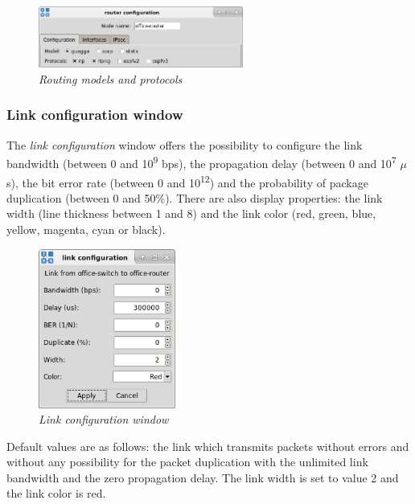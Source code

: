 \begin{figure}[H]
\centering
\vspace{10pt}
\includegraphics[width=0.6\textwidth]{./images/router_config_routingmodels.png}
\caption{\emph{Routing models and protocols}}
\label{fig:router_config_routingmodels}
\end{figure}

\subsubsection{Link configuration window}
The \emph{link configuration} window offers the possibility to configure the
link bandwidth (between 0 and 10\textsuperscript{9} bps), the propagation delay
(between 0 and 10\textsuperscript{7} $\mu$s), the bit error
rate (between 0 and 10\textsuperscript{12}) and the probability of package
duplication (between 0 and 50\%). There are also display properties: the link
width (line thickness between 1 and 8) and the link color (red, green, blue,
yellow, magenta, cyan or black).

\begin{figure}[H]
\centering
\vspace{10pt}
\includegraphics[width=0.4\textwidth]{./images/link_config.png}
\caption{\emph{Link configuration window}}
\label{fig:link_config}
\end{figure}

Default values are as follows: the link which transmits packets without errors
and without any possibility for the packet duplication with the unlimited link
bandwidth and the zero propagation delay. The link width is set to value 2 and
the link color is red.

